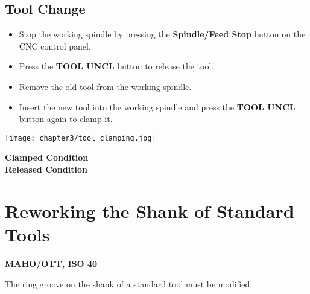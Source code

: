 \vspace{0.5cm}

\subsection{Tool Change} \footnotemark


\begin{itemize}
    \item Stop the working spindle by pressing the \textbf{Spindle/Feed Stop} button on the CNC control panel.
    \item Press the \textbf{TOOL UNCL} button to release the tool.
    \item Remove the old tool from the working spindle.
    \item Insert the new tool into the working spindle and press the \textbf{TOOL UNCL} button again to clamp it.
\end{itemize}


\vspace{0.5cm}

\begin{minipage}{0.6\textwidth}
    \centering
    \texttt{[image: chapter3/tool\_clamping.jpg]}
\end{minipage}%
\begin{minipage}{0.4\textwidth}
   \textbf{Clamped Condition}
    \vspace{3.2cm}\\
   \textbf{Released Condition}
\end{minipage}

\section{Reworking the Shank of Standard Tools}

\textbf{MAHO/OTT, ISO 40}

\vspace{.5cm}

\noindent The ring groove on the shank of a standard tool must be modified.

\vspace{0.5cm}

